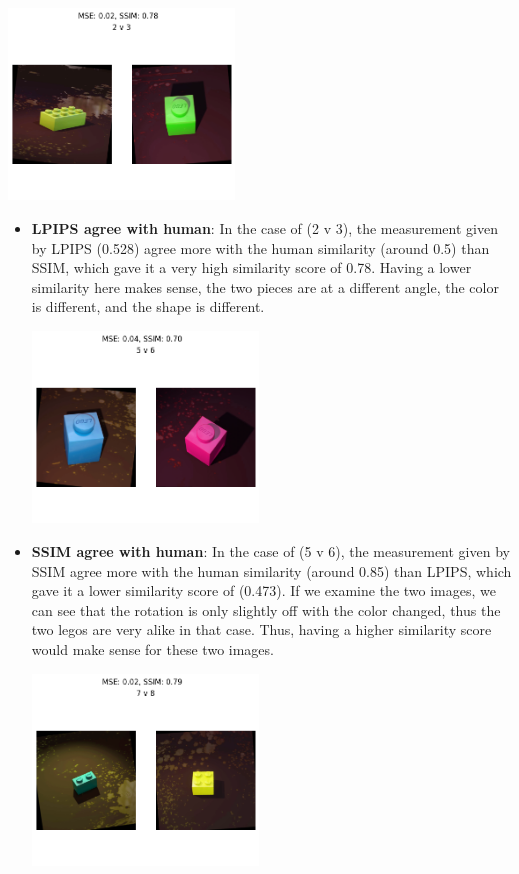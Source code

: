 \documentclass[]{article}
\begin{document}
\clearpage
\begin{center}
    \includegraphics[width=6cm]{MLE SSIM/23.png}
\end{center}
\begin{itemize}
\item
    \textbf{LPIPS agree with human}: In the case of (2 v 3), the measurement given by LPIPS (0.528) agree more with the human similarity (around 0.5) than SSIM, which gave it a very high similarity score of 0.78. Having a lower similarity here makes sense, the two pieces are at a different angle, the color is different, and the shape is different.\\
    \begin{center}
        \includegraphics[width=6cm]{MLE SSIM/56.png}
    \end{center}
\item
    \textbf{SSIM agree with human}: In the case of (5 v 6), the measurement given by SSIM agree more with the human similarity (around 0.85) than LPIPS, which gave it a lower similarity score of (0.473). If we examine the two images, we can see that the rotation is only slightly off with the color changed, thus the two legos are very alike in that case. Thus, having a higher similarity score would make sense for these two images.\\
    \clearpage
    \begin{center}
        \includegraphics[width=6cm]{MLE SSIM/78.png}

\end{center}
\end{itemize}
\end{document}
